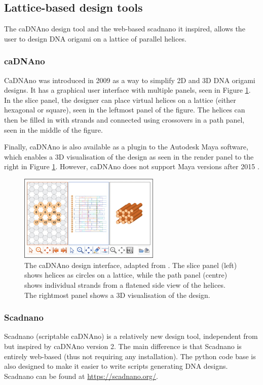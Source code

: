 \subsection{Lattice-based design tools}
The caDNAno design tool \cite{cadnano} and the web-based scadnano \cite{scadnano} it inspired, allows the user to design DNA origami on a lattice of parallel helices.
\subsubsection{caDNAno}
\label{sec:cadnano}
CaDNAno \cite{cadnano} was introduced in 2009 as a way to simplify 2D and 3D DNA origami designs. It has a graphical user interface with multiple panels, seen in Figure \ref{fig:cadnano}. In the slice panel, the designer can place virtual helices on a lattice (either hexagonal or square), seen in the leftmost panel of the figure. The helices can then be filled in with strands and connected using crossovers in a path panel, seen in the middle of the figure.

Finally, caDNAno is also available as a plugin to the Autodesk Maya software, which enables a 3D visualisation of the design as seen in the render panel to the right in Figure \ref{fig:cadnano}. However, caDNAno does not support Maya versions after 2015 \cite{cadnanoInstall}.

\begin{figure}[h]
  \begin{center}
    \includegraphics[width=0.6\textwidth]{figures/cadnano.jpeg}
    \caption{The caDNAno design interface, adapted from \cite{cadnano}. The slice panel (left) shows helices as circles on a lattice, while the path panel (centre) shows individual strands from a flatened side view of the helices. The rightmost panel shows a 3D visualisation of the design.}
    \label{fig:cadnano}
  \end{center}
\end{figure}

\subsubsection{Scadnano}
Scadnano \cite{scadnano} (scriptable caDNAno) is a relatively new design tool, independent from but inspired by caDNAno version 2. The main difference is that Scadnano is entirely web-based (thus not requiring any installation). The python code base is also designed to make it easier to write scripts generating DNA designs. Scadnano can be found at \url{https://scadnano.org/}.

